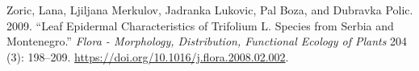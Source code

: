 \documentclass[
  12pt,
]{article}
\newlength{\cslhangindent}
\newlength{\cslentryspacingunit} %
\newenvironment{CSLReferences}[2] %
 {%
  \setlength{\parindent}{0pt}
  \ifodd #1
  \let\oldpar\par
  \def\par{\hangindent=\cslhangindent\oldpar}
  \fi
  \setlength{\parskip}{#2\cslentryspacingunit}
 }%
 {}
\begin{document}
\begin{CSLReferences}{1}{0}
\leavevmode{}%
Zoric, Lana, Ljiljana Merkulov, Jadranka Lukovic, Pal Boza, and Dubravka Polic. 2009. {``Leaf Epidermal Characteristics of {Trifolium} {L}. Species from {Serbia} and {Montenegro}.''} \emph{Flora - Morphology, Distribution, Functional Ecology of Plants} 204 (3): 198--209. \url{https://doi.org/10.1016/j.flora.2008.02.002}.

\end{CSLReferences}
\end{document}
